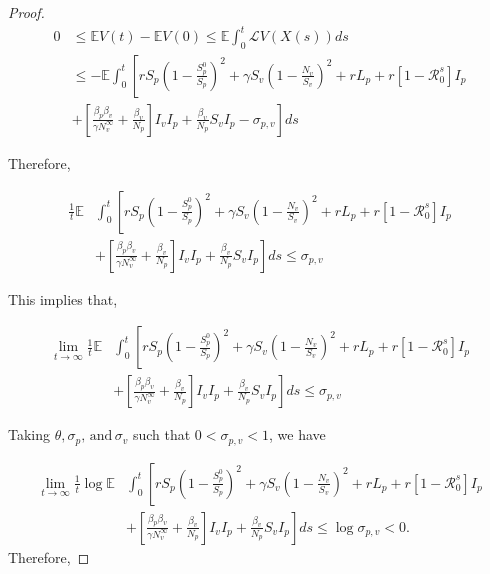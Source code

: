 \begin{proof}
	\begin{align*}
		0 
		&\leq
			\mathbb{E}V(t)-\mathbb{E}V(0)\leq\mathbb{E}\int_{0}^{t}\mathcal{L}V(X(s))ds\\
		&\leq
			-\mathbb{E}\int_{0}^{t}\left[rS_p\left(1-\frac{S_p^0}{S_p}\right)^2 +\gamma S_v\left(1-\frac{N_v}{S_v}\right)^2+rL_p+r\left[1-\mathcal{R}^s_0\right]I_p \right.\\
		&+
			\left.\left[\frac{\beta_p\beta_v}{\gamma N^\infty_v}+\frac{\beta_v}{N_p}\right]I_vI_p +\frac{\beta_v}{N_p}S_vI_p-\sigma_{p,v}\right]ds
	\end{align*}
	
	Therefore,
	
	\begin{align*}
		\frac{1}{t}\mathbb{E}
			&\int_{0}^{t}
				\left[rS_p\left(1-\frac{S_p^0}{S_p}\right)^2 +\gamma S_v\left(1-\frac{N_v}{S_v}\right)^2+rL_p+r\left[1-\mathcal{R}^s_0\right]I_p \right.\\
			&+
			\left.\left[\frac{\beta_p\beta_v}{\gamma N^\infty_v}+\frac{\beta_v}{N_p}\right]I_vI_p +\frac{\beta_v}{N_p}S_vI_p\right]ds\leq\sigma_{p,v}
	\end{align*}
	
	This implies that,
	
	\begin{align*}
		\lim\limits_{t\rightarrow \infty}\frac{1}{t}\mathbb{E}
		&\int_{0}^{t}
		\left[rS_p\left(1-\frac{S_p^0}{S_p}\right)^2 +\gamma S_v\left(1-\frac{N_v}{S_v}\right)^2+rL_p+r\left[1-\mathcal{R}^s_0\right]I_p \right.\\
		&+
		\left.\left[\frac{\beta_p\beta_v}{\gamma N^\infty_v}+\frac{\beta_v}{N_p}\right]I_vI_p +\frac{\beta_v}{N_p}S_vI_p\right]ds\leq\sigma_{p,v}
	\end{align*}
	
	Taking $\theta,\sigma_p,\,\mbox{and}\,\sigma_v$ such that $0<\sigma_{p,v}< 1$, we have
	
	\begin{align*}
		\lim\limits_{t\rightarrow \infty}\frac{1}{t}\log\mathbb{E}
			&\int_{0}^{t}
				\left[rS_p\left(1-\frac{S_p^0}{S_p}\right)^2 +\gamma S_v\left(1-\frac{N_v}{S_v}\right)^2+rL_p+r\left[1-\mathcal{R}^s_0\right]I_p \right.\\
			&+
				\left.\left[\frac{\beta_p\beta_v}{\gamma N^\infty_v}+\frac{\beta_v}{N_p}\right]I_vI_p +\frac{\beta_v}{N_p}S_vI_p\right]ds\leq\log\sigma_{p,v}<0.
	\end{align*}
	Therefore,
	

\end{proof}
